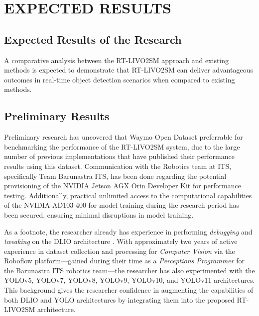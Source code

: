\chapter{EXPECTED RESULTS}

\section{Expected Results of the Research}

A comparative analysis between the RT-LIVO2SM approach and existing methods is expected to demonstrate that RT-LIVO2SM can deliver advantageous outcomes in real-time object detection scenarios when compared to existing methods.

\section{Preliminary Results}

\sloppy
Preliminary research has uncovered that Waymo Open Dataset preferrable for benchmarking the performance of the RT-LIVO2SM system, due to the large number of previous implementations that have published their performance results using this dataset. Communication with the Robotics team at ITS, specifically Team Barunastra ITS, has been done regarding the potential provisioning of the NVIDIA Jetson AGX Orin Developer Kit for performance testing. Additionally, practical unlimited access to the computational capabilities of the NVIDIA AD103-400 for model training during the research period has been secured, ensuring minimal disruptions in model training.

As a footnote, the researcher already has experience in performing \emph{debugging} and \emph{tweaking} on the DLIO architecture \parencite{dlio}. With approximately two years of active experience in dataset collection and processing for \emph{Computer Vision} via the Roboflow platform—gained during their time as a \emph{Perceptions Programmer} for the Barunastra ITS robotics team—the researcher has also experimented with the YOLOv5, YOLOv7, YOLOv8, YOLOv9, YOLOv10, and YOLOv11 architectures. This background gives the researcher confidence in augmenting the capabilities of both DLIO and YOLO architectures by integrating them into the proposed RT-LIVO2SM architecture.
